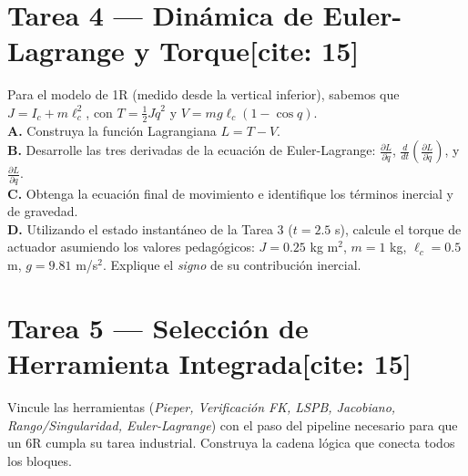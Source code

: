 \documentclass[11pt, a4paper]{article}
\begin{document}
\section*{Tarea 4 — Dinámica de Euler-Lagrange y Torque[cite: 15]}
Para el modelo de 1R (medido desde la vertical inferior), sabemos que $J = I_c + m\ell_c^2$, con $T = \frac{1}{2}J\dot{q}^2$ y $V = mg\ell_c(1-\cos q)$.\\
\textbf{A.} Construya la función Lagrangiana $L = T - V$.\\
\textbf{B.} Desarrolle las tres derivadas de la ecuación de Euler-Lagrange: $\frac{\partial L}{\partial \dot{q}}$, $\frac{d}{dt}\left( \frac{\partial L}{\partial \dot{q}} \right)$, y $\frac{\partial L}{\partial q}$.\\
\textbf{C.} Obtenga la ecuación final de movimiento e identifique los términos inercial y de gravedad.\\
\textbf{D.} Utilizando el estado instantáneo de la Tarea 3 ($t=2.5$ s), calcule el torque de actuador asumiendo los valores pedagógicos: $J=0.25$ kg m$^2$, $m=1$ kg, $\ell_c=0.5$ m, $g=9.81$ m/s$^2$. Explique el \textit{signo} de su contribución inercial.

\section*{Tarea 5 — Selección de Herramienta Integrada[cite: 15]}
Vincule las herramientas (\textit{Pieper, Verificación FK, LSPB, Jacobiano, Rango/Singularidad, Euler-Lagrange}) con el paso del pipeline necesario para que un 6R cumpla su tarea industrial. Construya la cadena lógica que conecta todos los bloques.
\end{document}
